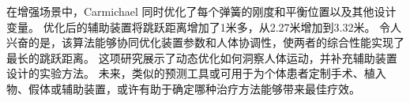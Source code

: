 在增强场景中，Carmichael 同时优化了每个弹簧的刚度和平衡位置以及其他设计变量。
优化后的辅助装置将跳跃距离增加了1米多，从2.27米增加到3.32米。
令人兴奋的是，该算法能够协同优化装置参数和人体协调性，使两者的综合性能实现了最长的跳跃距离。
这项研究展示了动态优化如何洞察人体运动，并补充辅助装置设计的实验方法。
未来，类似的预测工具或可用于为个体患者定制手术、植入物、假体或辅助装置，或许有助于确定哪种治疗方法能够带来最佳疗效。






